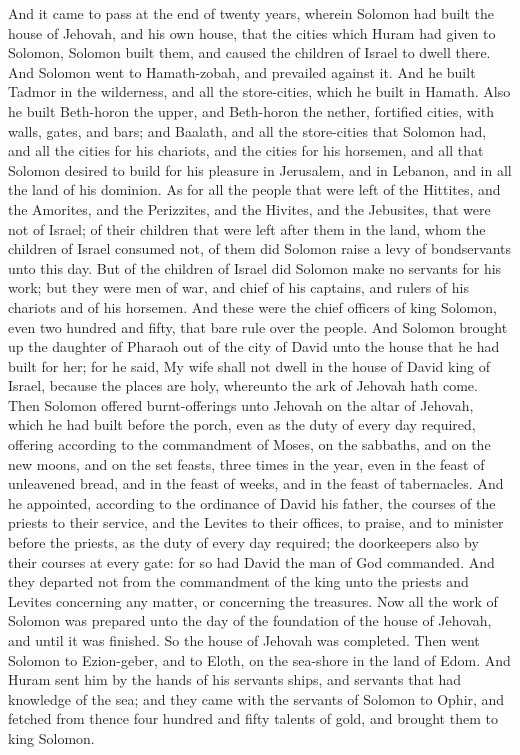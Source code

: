 And it came to pass at the end of twenty years, wherein Solomon had built the house of Jehovah, and his own house, that the cities which Huram had given to Solomon, Solomon built them, and caused the children of Israel to dwell there.  And Solomon went to Hamath-zobah, and prevailed against it. And he built Tadmor in the wilderness, and all the store-cities, which he built in Hamath. Also he built Beth-horon the upper, and Beth-horon the nether, fortified cities, with walls, gates, and bars; and Baalath, and all the store-cities that Solomon had, and all the cities for his chariots, and the cities for his horsemen, and all that Solomon desired to build for his pleasure in Jerusalem, and in Lebanon, and in all the land of his dominion.  As for all the people that were left of the Hittites, and the Amorites, and the Perizzites, and the Hivites, and the Jebusites, that were not of Israel; of their children that were left after them in the land, whom the children of Israel consumed not, of them did Solomon raise a levy of bondservants unto this day. But of the children of Israel did Solomon make no servants for his work; but they were men of war, and chief of his captains, and rulers of his chariots and of his horsemen. And these were the chief officers of king Solomon, even two hundred and fifty, that bare rule over the people.  And Solomon brought up the daughter of Pharaoh out of the city of David unto the house that he had built for her; for he said, My wife shall not dwell in the house of David king of Israel, because the places are holy, whereunto the ark of Jehovah hath come.  Then Solomon offered burnt-offerings unto Jehovah on the altar of Jehovah, which he had built before the porch, even as the duty of every day required, offering according to the commandment of Moses, on the sabbaths, and on the new moons, and on the set feasts, three times in the year, even in the feast of unleavened bread, and in the feast of weeks, and in the feast of tabernacles.  And he appointed, according to the ordinance of David his father, the courses of the priests to their service, and the Levites to their offices, to praise, and to minister before the priests, as the duty of every day required; the doorkeepers also by their courses at every gate: for so had David the man of God commanded. And they departed not from the commandment of the king unto the priests and Levites concerning any matter, or concerning the treasures.  Now all the work of Solomon was prepared unto the day of the foundation of the house of Jehovah, and until it was finished. So the house of Jehovah was completed.  Then went Solomon to Ezion-geber, and to Eloth, on the sea-shore in the land of Edom. And Huram sent him by the hands of his servants ships, and servants that had knowledge of the sea; and they came with the servants of Solomon to Ophir, and fetched from thence four hundred and fifty talents of gold, and brought them to king Solomon. 

